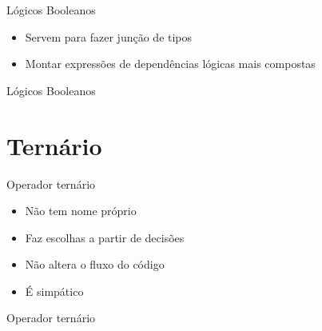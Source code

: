 \documentclass[11pt]{beamer}
\begin{document}

	\begin{frame}{Lógicos Booleanos}
		\begin{itemize}
			\presentationPause\item Servem para fazer junção de tipos 
			\presentationPause\item Montar expressões de dependências lógicas mais compostas
		\end{itemize}
		\presentationPause
	\end{frame}\begin{frame}{Lógicos Booleanos}
		
	\end{frame}

\section{Ternário}
	\begin{frame}{Operador ternário}
		\begin{itemize}
			\presentationPause\item Não tem nome próprio \presentationPause\frownie
			\presentationPause\item Faz escolhas a partir de decisões
			\presentationPause\item Não altera o fluxo do código
			\presentationPause\item É simpático
		\end{itemize}
		\presentationPause
	\end{frame}\begin{frame}{Operador ternário}
		
	\end{frame}
\end{document}
